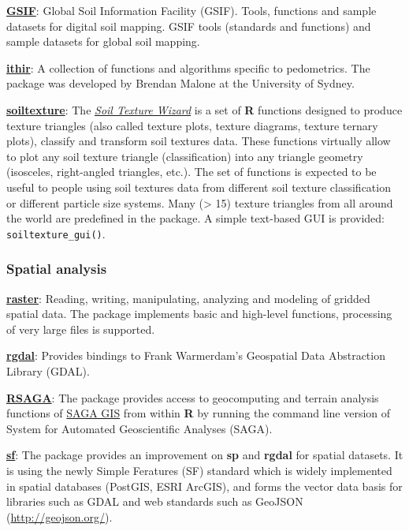 \documentclass[10pt,b5paper,]{book}
\theoremstyle{definition}
\theoremstyle{definition}
\theoremstyle{definition}
\theoremstyle{remark}
\begin{document}
\href{https://CRAN.R-project.org/package=GSIF}{\textbf{GSIF}}: Global
Soil Information Facility (GSIF). Tools, functions and sample datasets
for digital soil mapping. GSIF tools (standards and functions) and
sample datasets for global soil mapping.

\href{http://ithir.r-forge.r-project.org/}{\textbf{ithir}}: A collection
of functions and algorithms specific to pedometrics. The package was
developed by Brendan Malone at the University of Sydney.

\href{https://CRAN.R-project.org/package=soiltexture}{\textbf{soiltexture}}:
The
\href{https://cran.r-project.org/web/packages/soiltexture/vignettes/soiltexture_vignette.pdf}{\emph{Soil
Texture Wizard}} is a set of \textbf{R} functions designed to produce
texture triangles (also called texture plots, texture diagrams, texture
ternary plots), classify and transform soil textures data. These
functions virtually allow to plot any soil texture triangle
(classification) into any triangle geometry (isosceles, right-angled
triangles, etc.). The set of functions is expected to be useful to
people using soil textures data from different soil texture
classification or different particle size systems. Many (\textgreater{}
15) texture triangles from all around the world are predefined in the
package. A simple text-based GUI is provided:
\texttt{soiltexture\_gui()}.

\hypertarget{spatial-analysis}{%
\subsubsection{Spatial analysis}\label{spatial-analysis}}

\href{https://CRAN.R-project.org/package=raster}{\textbf{raster}}:
Reading, writing, manipulating, analyzing and modeling of gridded
spatial data. The package implements basic and high-level functions,
processing of very large files is supported.

\href{https://CRAN.R-project.org/package=rgdal}{\textbf{rgdal}}:
Provides bindings to Frank Warmerdam's Geospatial Data Abstraction
Library (GDAL).

\href{https://CRAN.R-project.org/package=RSAGA}{\textbf{RSAGA}}: The
package provides access to geocomputing and terrain analysis functions
of \href{/url\%7Bhttp://www.saga-gis.org/en/index.html\%7D}{SAGA GIS}
from within \textbf{R} by running the command line version of System for
Automated Geoscientific Analyses (SAGA).

\href{https://cran.r-project.org/web/packages/sf/index.html}{\textbf{sf}}:
The package provides an improvement on \textbf{sp} and \textbf{rgdal}
for spatial datasets. It is using the newly Simple Feratures (SF)
standard which is widely implemented in spatial databases (PostGIS, ESRI
ArcGIS), and forms the vector data basis for libraries such as GDAL and
web standards such as GeoJSON (\url{http://geojson.org/}).
\end{document}
